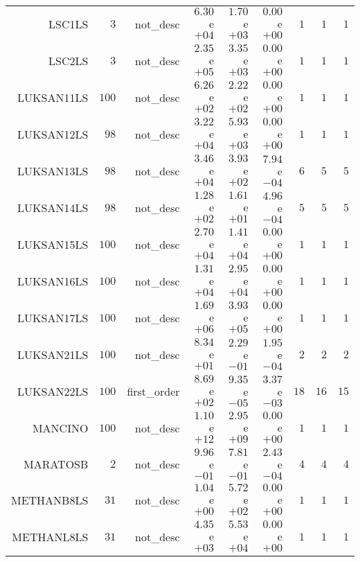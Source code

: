 \begin{longtable}{rrrrrrrrr}
LSC1LS & \(     3\) & not\_desc & \( 6.30\)e\(+04\) & \( 1.70\)e\(+03\) & \( 0.00\)e\(+00\) & \(     1\) & \(     1\) & \(     1\) \\
LSC2LS & \(     3\) & not\_desc & \( 2.35\)e\(+05\) & \( 3.35\)e\(+03\) & \( 0.00\)e\(+00\) & \(     1\) & \(     1\) & \(     1\) \\
LUKSAN11LS & \(   100\) & not\_desc & \( 6.26\)e\(+02\) & \( 2.22\)e\(+02\) & \( 0.00\)e\(+00\) & \(     1\) & \(     1\) & \(     1\) \\
LUKSAN12LS & \(    98\) & not\_desc & \( 3.22\)e\(+04\) & \( 5.93\)e\(+03\) & \( 0.00\)e\(+00\) & \(     1\) & \(     1\) & \(     1\) \\
LUKSAN13LS & \(    98\) & not\_desc & \( 3.46\)e\(+04\) & \( 3.93\)e\(+02\) & \( 7.94\)e\(-04\) & \(     6\) & \(     5\) & \(     5\) \\
LUKSAN14LS & \(    98\) & not\_desc & \( 1.28\)e\(+02\) & \( 1.61\)e\(+01\) & \( 4.96\)e\(-04\) & \(     5\) & \(     5\) & \(     5\) \\
LUKSAN15LS & \(   100\) & not\_desc & \( 2.70\)e\(+04\) & \( 1.41\)e\(+04\) & \( 0.00\)e\(+00\) & \(     1\) & \(     1\) & \(     1\) \\
LUKSAN16LS & \(   100\) & not\_desc & \( 1.31\)e\(+04\) & \( 2.95\)e\(+04\) & \( 0.00\)e\(+00\) & \(     1\) & \(     1\) & \(     1\) \\
LUKSAN17LS & \(   100\) & not\_desc & \( 1.69\)e\(+06\) & \( 3.93\)e\(+05\) & \( 0.00\)e\(+00\) & \(     1\) & \(     1\) & \(     1\) \\
LUKSAN21LS & \(   100\) & not\_desc & \( 8.34\)e\(+01\) & \( 2.29\)e\(-01\) & \( 1.95\)e\(-04\) & \(     2\) & \(     2\) & \(     2\) \\
LUKSAN22LS & \(   100\) & first\_order & \( 8.69\)e\(+02\) & \( 9.35\)e\(-05\) & \( 3.37\)e\(-03\) & \(    18\) & \(    16\) & \(    15\) \\
MANCINO & \(   100\) & not\_desc & \( 1.10\)e\(+12\) & \( 2.95\)e\(+09\) & \( 0.00\)e\(+00\) & \(     1\) & \(     1\) & \(     1\) \\
MARATOSB & \(     2\) & not\_desc & \( 9.96\)e\(-01\) & \( 7.81\)e\(-01\) & \( 2.43\)e\(-04\) & \(     4\) & \(     4\) & \(     4\) \\
METHANB8LS & \(    31\) & not\_desc & \( 1.04\)e\(+00\) & \( 5.72\)e\(+02\) & \( 0.00\)e\(+00\) & \(     1\) & \(     1\) & \(     1\) \\
METHANL8LS & \(    31\) & not\_desc & \( 4.35\)e\(+03\) & \( 5.53\)e\(+04\) & \( 0.00\)e\(+00\) & \(     1\) & \(     1\) & \(     1\) \\

\end{longtable}
